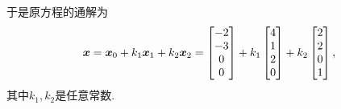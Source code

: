 \begin{example}
\begin{solution}
于是原方程的通解为\begin{equation*}
	\boldsymbol{x} = \boldsymbol{x}_0 + k_1 \boldsymbol{x}_1 + k_2 \boldsymbol{x}_2
	= \begin{bmatrix} -2 \\ -3 \\ 0 \\ 0 \end{bmatrix}
	+ k_1 \begin{bmatrix} 4 \\ 1 \\ 2 \\ 0 \end{bmatrix}
	+ k_2 \begin{bmatrix} 2 \\ 2 \\ 0 \\ 1 \end{bmatrix},
\end{equation*}
其中\(k_1,k_2\)是任意常数.
\end{solution}
\end{example}

